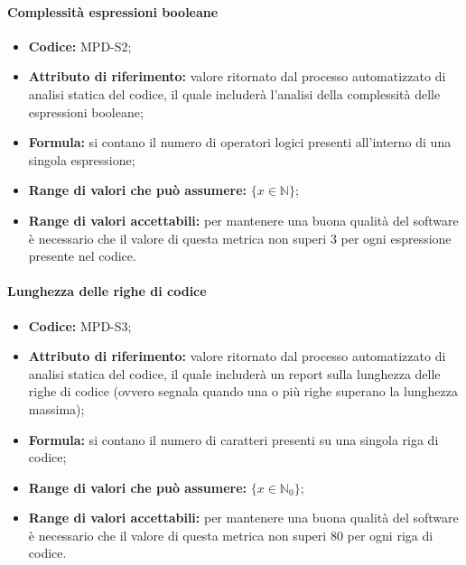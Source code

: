 \paragraph{Complessità espressioni booleane}
\begin{itemize}
    \item \textbf{Codice:} MPD-S2;
    \item \textbf{Attributo di riferimento:} valore ritornato dal processo automatizzato di analisi statica del codice, il quale includerà l'analisi della complessità delle espressioni booleane;
    \item \textbf{Formula:} si contano il numero di operatori logici presenti all'interno di una singola espressione;
    \item \textbf{Range di valori che può assumere:} $\{x \in \mathbb{N} \}$;
    \item \textbf{Range di valori accettabili:} per mantenere una buona qualità del software è necessario che il valore di questa metrica non superi
    3 per ogni espressione presente nel codice.
\end{itemize}

\paragraph{Lunghezza delle righe di codice}
\begin{itemize}
    \item \textbf{Codice:} MPD-S3;
    \item \textbf{Attributo di riferimento:} valore ritornato dal processo automatizzato di analisi statica del codice, il quale includerà un report sulla lunghezza delle righe di codice
                                            (ovvero segnala quando una o più righe superano la lunghezza massima);
    \item \textbf{Formula:} si contano il numero di caratteri presenti su una singola riga di codice;
    \item \textbf{Range di valori che può assumere:} $\{x \in \mathbb{N}_0 \}$;
    \item \textbf{Range di valori accettabili:} per mantenere una buona qualità del software è necessario che il valore di questa metrica non superi
    80 per ogni riga di codice.
\end{itemize}

